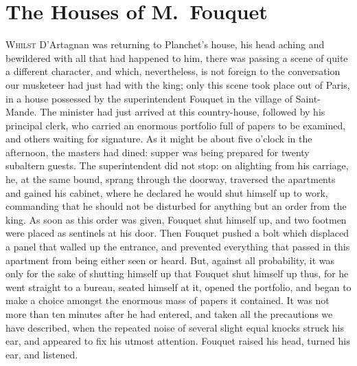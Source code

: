 \chapter{The Houses of M.~Fouquet}
	
\lettrine{W}{hilst} D'Artagnan was returning to Planchet's house, his head aching and bewildered with all that had happened to him, there was passing a scene of quite a different character, and which, nevertheless, is not foreign to the conversation our musketeer had just had with the king; only this scene took place out of Paris, in a house possessed by the superintendent Fouquet in the village of Saint-Mande. The minister had just arrived at this country-house, followed by his principal clerk, who carried an enormous portfolio full of papers to be examined, and others waiting for signature. As it might be about five o'clock in the afternoon, the masters had dined: supper was being prepared for twenty subaltern guests. The superintendent did not stop: on alighting from his carriage, he, at the same bound, sprang through the doorway, traversed the apartments and gained his cabinet, where he declared he would shut himself up to work, commanding that he should not be disturbed for anything but an order from the king. As soon as this order was given, Fouquet shut himself up, and two footmen were placed as sentinels at his door. Then Fouquet pushed a bolt which displaced a panel that walled up the entrance, and prevented everything that passed in this apartment from being either seen or heard. But, against all probability, it was only for the sake of shutting himself up that Fouquet shut himself up thus, for he went straight to a bureau, seated himself at it, opened the portfolio, and began to make a choice amongst the enormous mass of papers it contained. It was not more than ten minutes after he had entered, and taken all the precautions we have described, when the repeated noise of several slight equal knocks struck his ear, and appeared to fix his utmost attention. Fouquet raised his head, turned his ear, and listened.

